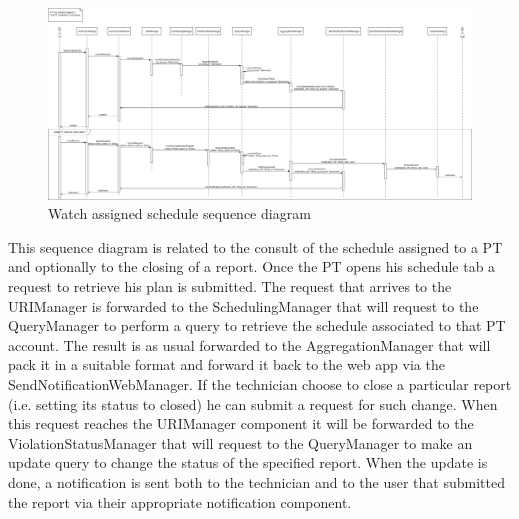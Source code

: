 \begin{figure}[H]
  \centering
  \includegraphics[width=1\textwidth]{Images/UML_diagrams/Sequence_Diagrams/Watch_schedule_sd.png}
  \caption{Watch assigned schedule sequence diagram}
  \label{fig:watch_schedule_sd}
\end{figure}
This sequence diagram is related to the consult of the schedule assigned to a PT and optionally to the closing of a report. Once the PT opens his schedule tab a request to retrieve his plan is submitted. The request that arrives to the URIManager is forwarded to the SchedulingManager that will request to the QueryManager to perform a query to retrieve the schedule associated to that PT account. The result is as usual forwarded to the AggregationManager that will pack it in a suitable format and forward it back to the web app via the SendNotificationWebManager. If the technician choose to close a particular report (i.e. setting its status to closed) he can submit a request for such change. When this request reaches the URIManager component it will be forwarded to the ViolationStatusManager that will request to the QueryManager to make an update query to change the status of the specified report. When the update is done, a notification is sent both to the technician and to the user that submitted the report via their appropriate notification component. 
